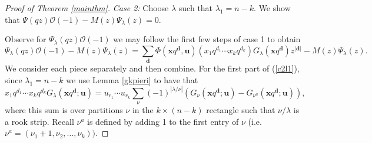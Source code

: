 \documentclass[12pt]{article}
\newcommand{\OC}{\mathcal{O}}
\theoremstyle{plain}
\theoremstyle{definition}
\newcommand{\xb}{\boldsymbol{x}}
\newcommand{\db}{\boldsymbol{d}}
\newcommand{\ub}{\boldsymbol{u}}
\begin{document}
\begin{proof}[Proof of Theorem \ref{mainthm}]
\noindent\emph{Case 2:} Choose $\lambda$ such that $\lambda_1 = n-k$. We show that $\Psi(qz) \OC(-1) - M(z) \Psi_\lambda(z)=0$. 

Observe for $\Psi_\lambda(qz)  \OC(-1)$ we may follow the first few steps of case 1 to obtain
\begin{equation}\label{c2l1}
    \Psi_\lambda(qz) \OC(-1) \!- \! M(z)\Psi_\lambda(z)
     \!=\! \sum \limits_{\boldsymbol{d}} \!\Phi(\xb q^{\boldsymbol{d}},\ub) \left( x_1q^{d_1}\cdots x_kq^{d_k}\right)G_{\lambda} \left( \xb q^{\boldsymbol{d}}\right)z^{|\boldsymbol{d}|}  -M(z)\Psi_\lambda(z).
\end{equation}
We consider each piece separately and then combine. For the first part of (\ref{c2l1}), since $\lambda_1=n-k$ we use Lemma \ref{gkpieri} to have that 
\begin{equation} \label{gkppf}
x_1q^{d_1}\cdots x_kq^{d_k} G_\lambda(\xb q^{\db};\ub)  = u_{r_1}\cdots u_{r_k}\sum \limits_{\nu} (-1)^{|\lambda / \nu|} \left( G_\nu(\xb q^{\db};\ub)  -G_{\nu^a}(\xb q^{\db};\ub) \right),
\end{equation}
where this sum is over partitions $\nu$ in the $k\times (n-k)$ rectangle such that $\nu/\lambda$ is a rook strip. Recall $\nu^a$ is defined by adding 1 to the first entry of $\nu$ (i.e. $\nu^a=(\nu_1+1,\nu_2,\dots, \nu_k))$.


\end{proof}
\end{document}
